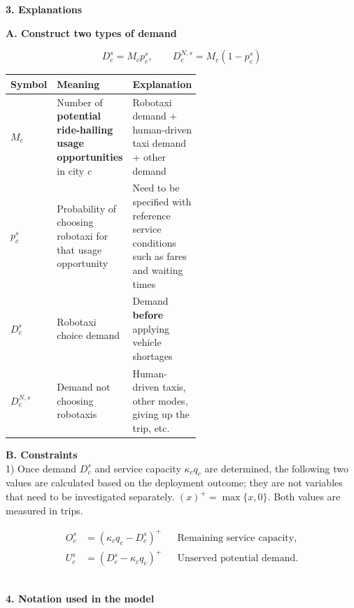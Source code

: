 \documentclass[10pt,a4paper]{article}
\newcommand{\hd}[1]{\par\vspace{8pt}\textbf{#1}\par\vspace{3pt}}
\begin{document}

\hd{3. Explanations}

\textbf{A. Construct two types of demand }

\[
D_c^s = M_c p_c^s,\qquad 
D_c^{N,s}= M_c (1-p_c^s)
\]

{\small
\begin{tabularx}{\linewidth}{@{}>{\raggedright\arraybackslash}p{0.12\linewidth}>{\raggedright\arraybackslash}p{0.42\linewidth}Y@{}}
\toprule
Symbol & Meaning & Explanation \\ \midrule
$M_c$ & Number of \textbf{potential ride-hailing usage opportunities} in city $c$ & Robotaxi demand + human-driven taxi demand + other demand \\
$p_c^s$ & Probability of choosing robotaxi for that usage opportunity & Need to be specified with reference service conditions such as fares and waiting times \\
$D_c^s$ & Robotaxi choice demand & Demand \textbf{before} applying vehicle shortages \\
$D_c^{N,s}$ & Demand not choosing robotaxis & Human-driven taxis, other modes, giving up the trip, etc. \\
\bottomrule
\end{tabularx}
}

\textbf{B. Constraints}\\
1) Once demand $D_c^s$ and service capacity $\kappa_c q_c$ are determined, the following two values are calculated based on the deployment outcome; they are not variables that need to be investigated separately. $(x)^+=\max\{x,0\}$. Both values are measured in trips.

\[
\begin{aligned}
O_c^s&=(\kappa_c q_c-D_c^s)^+&&\text{Remaining service capacity},\\
U_c^s&=(D_c^s-\kappa_c q_c)^+&&\text{Unserved potential demand}.
\end{aligned}
\]\\

\newpage
\hd{4. Notation used in the model}
\end{document}
